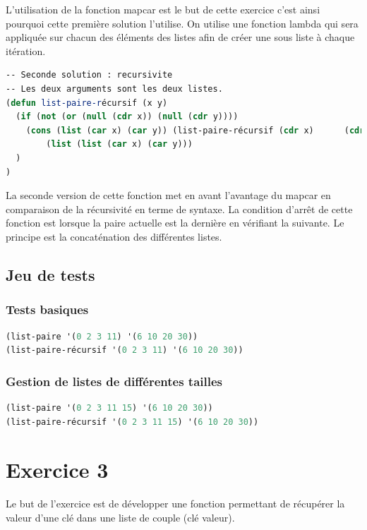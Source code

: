 \documentclass[a4paper,10pt]{report}
\begin{document}
	  L’utilisation de la fonction mapcar est le but de cette exercice c’est ainsi pourquoi cette première solution l’utilise. On utilise une fonction lambda qui sera appliquée sur chacun des éléments des listes afin de créer une sous liste à chaque itération.
	  
	    \begin{lstlisting}[language=Lisp]
-- Seconde solution : recursivite
-- Les deux arguments sont les deux listes.
(defun list-paire-récursif (x y)
  (if (not (or (null (cdr x)) (null (cdr y))))
  	(cons (list (car x) (car y)) (list-paire-récursif (cdr x)      (cdr y)))
     	(list (list (car x) (car y)))
  )
)
	  \end{lstlisting}
	  
La seconde version de cette fonction met en avant l’avantage du mapcar en comparaison de la récursivité en terme de syntaxe. La condition d’arrêt de cette fonction est lorsque la paire actuelle est la dernière en vérifiant la suivante. Le principe est la concaténation des différentes listes. \newpage
	  \section{Jeu de tests}

	  \subsection{Tests basiques}
	  \begin{lstlisting}[language=Lisp]
(list-paire '(0 2 3 11) '(6 10 20 30))
(list-paire-récursif '(0 2 3 11) '(6 10 20 30))
	  \end{lstlisting}

	  \subsection{Gestion de listes de différentes tailles}
	  \begin{lstlisting}[language=Lisp]
(list-paire '(0 2 3 11 15) '(6 10 20 30))
(list-paire-récursif '(0 2 3 11 15) '(6 10 20 30))
	  \end{lstlisting}
	  
	  \chapter{Exercice 3}
	  
	  Le but de l'exercice est de développer une fonction permettant de récupérer la valeur d'une clé dans une liste de couple (clé valeur).
	  
\end{document}
